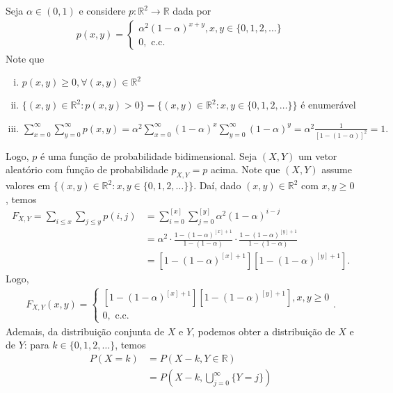 \documentclass[../Notas.tex]{subfiles}
\begin{document}
\begin{example}
Seja $\alpha\in (0,1)$ e considere $p:\mathbb{R}^2\to\mathbb{R}$ dada por
\begin{align*}
    p(x,y) = \begin{cases}
    \alpha^2(1-\alpha)^{x+y}, x,y\in\{0,1,2,\dots\} \\
    0, \text{ c.c.}
    \end{cases}
\end{align*}
Note que
\begin{enumerate}[(i)]
    \item $p(x,y)\geq 0, \forall (x,y)\in\mathbb{R}^2$ 
    \item $\{ (x,y)\in\mathbb{R}^2 : p(x,y) > 0 \} = \{ (x,y)\in\mathbb{R}^2 : x,y\in\{ 0,1,2,\dots \} \}$ é enumerável
    \item $\displaystyle{ \sum_{x=0}^{\infty}\sum_{y=0}^{\infty} p(x,y) = \alpha^2\sum_{x=0}^{\infty}(1-\alpha)^x\sum_{y=0}^{\infty}(1-\alpha)^y = \alpha^2\frac{1}{[1-(1-\alpha)]^2} = 1 .}$
\end{enumerate}
Logo, $p$ é uma função de probabilidade bidimensional. Seja $(X,Y)$ um vetor aleatório com função de probabilidade $p_{X,Y} = p$ acima. Note que $(X,Y)$ assume valores em $\{ (x,y)\in\mathbb{R}^2 : x,y\in\{0,1,2,\dots\} \}$. Daí, dado $(x,y)\in\mathbb{R}^2$ com $x,y\geq 0$, temos
\begin{align*}
    F_{X,Y} = \sum_{i\leq x}\sum_{j\leq y} p(i,j) &= \sum_{i=0}^{[x]}\sum_{j=0}^{[y]}\alpha^2(1-\alpha)^{i-j} \\
    &= \alpha^2\cdot\frac{ 1- (1-\alpha)^{[x] + 1} }{1 - (1-\alpha)}\cdot\frac{ 1 - (1-\alpha)^{[y] + 1} }{ 1 - (1-\alpha) } \\
    &= [1 - (1-\alpha)^{[x] + 1}][1 - (1-\alpha)^{[y] + 1}].
\end{align*}
Logo, 
\begin{align*}
    F_{X,Y}(x,y) = \begin{cases}
    [1 - (1-\alpha)^{[x] + 1}][1 - (1-\alpha)^{[y] + 1}], x,y\geq 0 \\
    0, \text{ c.c.}
    \end{cases}.
\end{align*}
Ademais, da distribuição conjunta de $X$ e $Y$, podemos obter a distribuição de $X$ e de $Y$: para $k\in\{0,1,2,\dots\}$, temos
\begin{align*}
    P(X=k) &= P(X-k, Y\in\mathbb{R}) \\
           &= P\left( X-k, \bigcup_{j=0}^{\infty}\{Y=j\} \right) \\

\end{align*}
\end{example}
\end{document}
